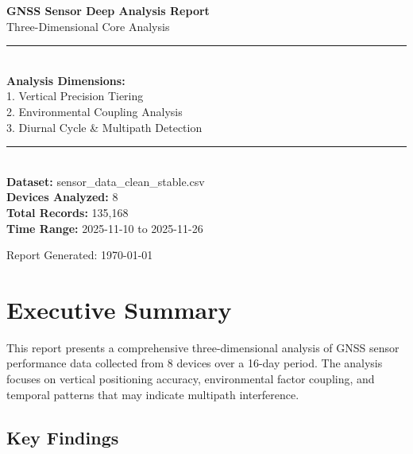 \documentclass[11pt,a4paper]{article}
\begin{document}
\begin{titlepage}
    \centering
    \vspace*{2cm}

    {\Huge\bfseries GNSS Sensor Deep Analysis Report\\[0.5cm]}
    {\Large Three-Dimensional Core Analysis\\[2cm]}

    \rule{\textwidth}{1pt}\\[0.5cm]

    {\large
    \textbf{Analysis Dimensions:}\\[0.3cm]
    1. Vertical Precision Tiering\\
    2. Environmental Coupling Analysis\\
    3. Diurnal Cycle \& Multipath Detection\\[1cm]
    }

    \rule{\textwidth}{1pt}\\[2cm]

    {\large
    \textbf{Dataset:} sensor\_data\_clean\_stable.csv\\[0.3cm]
    \textbf{Devices Analyzed:} 8\\[0.3cm]
    \textbf{Total Records:} 135,168\\[0.3cm]
    \textbf{Time Range:} 2025-11-10 to 2025-11-26\\[2cm]
    }

    \vfill

    {\large Report Generated: \today}

\end{titlepage}

\tableofcontents
\newpage

\section{Executive Summary}

This report presents a comprehensive three-dimensional analysis of GNSS sensor performance data collected from 8 devices over a 16-day period. The analysis focuses on vertical positioning accuracy, environmental factor coupling, and temporal patterns that may indicate multipath interference.

\subsection{Key Findings}
\end{document}
